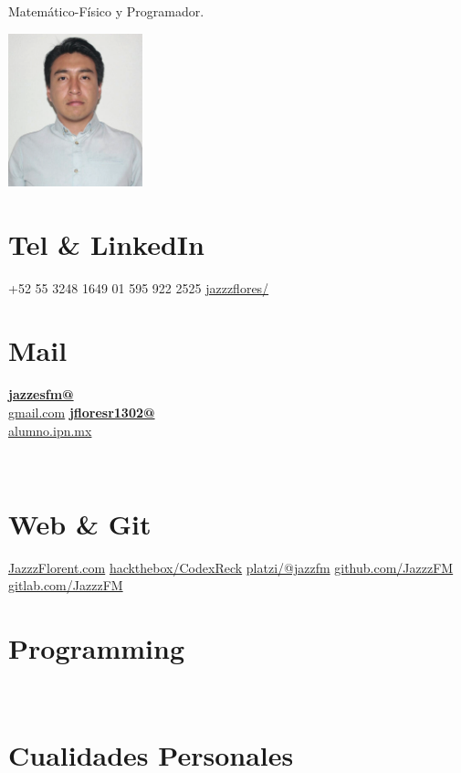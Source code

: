 \documentclass[]{friggeri-cv}
\begin{document}
      {Matemático-Físico y Programador. }
      

\begin{aside}
  \includegraphics[width=3.9cm]{jejejejejej.png}
  \section{Tel \& LinkedIn}
    +52 55 3248 1649
    01 595 922 2525
\href{https://www.linkedin.com/in/jazzzflores/}{jazzzflores/}    
    ~
  \section{Mail}
    \href{mailto:jazzesfm@gmail.com}{\textbf{jazzesfm@}\\gmail.com}
    \href{mailto:jfloresr1302@alumno.ipn.mx}{\textbf{jfloresr1302@}\\alumno.ipn.mx}

    ~
  \section{Web \& Git}
    \href{https://medium.com/@jazzesfm}{JazzzFlorent.com}
   \href{https://www.hackthebox.eu/profile/171317}{hackthebox/CodexReck}
   \href{https://platzi.com/@jazzfm/}{platzi/@jazzfm}   
   \href{https://github.com/JazzzFM}{github.com/JazzzFM}
   \href{https://gitlab.com/u/JazzzFM?}{gitlab.com/JazzzFM}
    ~
  \section{Programming}
    ~
  \section{Cualidades Personales}
    ~
\end{aside}
~
\end{document}

